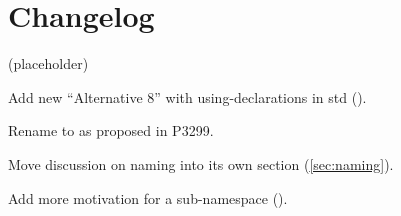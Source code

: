 \section{Changelog}
(placeholder)
\begin{revision}
\item Add new “Alternative 8” with using-declarations in std ().
\item Rename  to  as proposed in P3299.
\item Move discussion on naming into its own section (\ref{sec:naming}).
\item Add more motivation for a sub-namespace ().
\end{revision}
